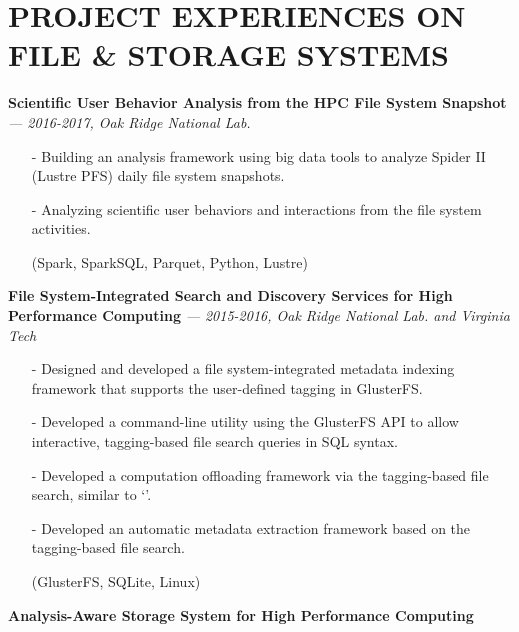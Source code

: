 \section{PROJECT EXPERIENCES ON FILE \& STORAGE SYSTEMS} 
\vspace{0.03in}
  {\bf Scientific User Behavior Analysis from the HPC File System Snapshot}
   {\it \footnotesize --- 2016-2017, Oak Ridge National Lab.}
   \begin{itemize}[leftmargin=*]
    \setlength\itemsep{-0.02in}
    \item[-] Building an analysis framework using big data tools to analyze
Spider II (Lustre PFS) daily file system snapshots.
    \item[-] Analyzing scientific user behaviors and interactions
from the file system activities.
    \item[] {\small(Spark, SparkSQL, Parquet, Python, Lustre)}
   \end{itemize}
  \vspace{-0.15in}
  {\bf File System-Integrated Search and Discovery Services for High Performance Computing}
   {\it \footnotesize --- 2015-2016, Oak Ridge National Lab. and Virginia Tech}
   \begin{itemize}[leftmargin=*]
    \setlength\itemsep{-0.02in}
    \item[-] Designed and developed a file system-integrated metadata indexing framework
	     that supports the user-defined tagging in GlusterFS.
    \item[-] Developed a command-line utility using the GlusterFS API to
             allow interactive, tagging-based file search queries in SQL syntax.
    \item[-] Developed a computation offloading framework via the tagging-based file search,
             similar to `'.
    \item[-] Developed an automatic metadata
	     extraction framework based on the tagging-based file search.
    \item[] {\small(GlusterFS, SQLite, Linux)}
   \end{itemize}
  \vspace{-0.15in}
  {\bf Analysis-Aware Storage System for High Performance Computing}
